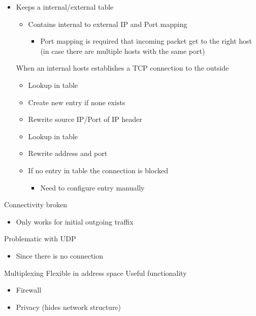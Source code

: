 \begin{itemize}
\begin{itemize}
        \end{itemize}
        \begin{itemize}
            \item Keeps a internal/external table
                \begin{itemize}
                    \item Contains internal to external IP and Port mapping
                        \begin{itemize}
                            \item Port mapping is required that incoming packet get to the right host (in case there are multiple hosts with the same port)
                        \end{itemize}
                \end{itemize}
             When an internal hosts establishes a TCP connection to the outside
                \begin{itemize}
                    \item Lookup in table
                    \item Create new entry if none exists
                    \item Rewrite source IP/Port of IP header
                \end{itemize}
                \begin{itemize}
                    \item Lookup in table
                    \item Rewrite address and port
                    \item If no entry in table the connection is blocked
                        \begin{itemize}
                            \item Need to configure entry manually
                        \end{itemize}
                \end{itemize}
        \end{itemize}
    \icon Connectivity broken
        \begin{itemize}
            \item Only works for initial outgoing traffix
        \end{itemize}
    \icon Problematic with UDP
        \begin{itemize}
            \item Since there is no connection 
        \end{itemize}
    \ipro Multiplexing
    \ipro Flexible in address space
    \ipro Useful functionality
        \begin{itemize}
            \item Firewall
            \item Privacy (hides network structure)
        \end{itemize}
\end{itemize}

